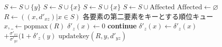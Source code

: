 \begin{algorithm}[H]
\begin{multicols}{2}
\begin{algorithmic}[1]
      \State $S\gets S\cup\{y\}$
      \EndIf
      \State $S\gets S\cup\{x\}$
      \EndIf
      \EndFor
      \State $S\gets S\cup\{x\}$
      \EndIf
      \EndWhile
      \State $S\gets S\cup\mathrm{Affected}$
      \State $\mathrm{Affected}\gets\varnothing$
      \State $R\gets((x,d'_{xz})\vert x\in S)$
      \Comment 各要素の第二要素をキーとする順位キュー
      \State $x,\_\gets\mathrm{popmax}(R)$
      \State $\delta'_z(x)\gets 0$
      \State \textbf{continue}
      \EndIf
      \State $\delta'_z(x)\gets\delta'_z(x)$
      $+\frac{\sigma'_{xz}}{\sigma'_{yz}}(1+\delta'_z(y)$
      \State $\mathrm{updatekey}(R, y, d'_{yz})$
      \EndIf
      \EndFor
      \EndWhile
      \EndProcedure
    \end{algorithmic}
  \end{multicols}
\end{algorithm}
